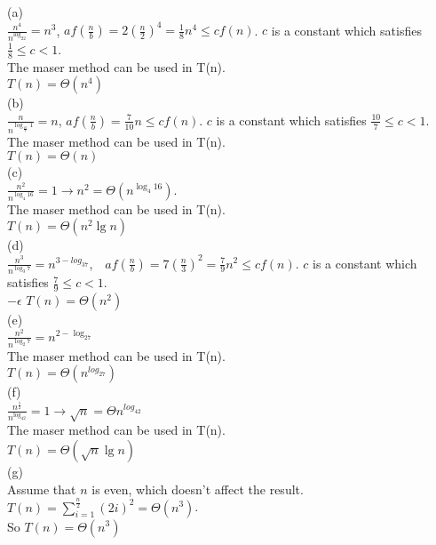 \documentclass[a4paper, justified]{tufte-handout}
\begin{document}
\begin{solution}
  (a)\\
  $\frac{n^4}{n^{\log_22}}=n^3$, $af(\frac{n}{b})=2(\frac{n}{2})^4=\frac{1}{8}n^4\leq cf(n)$. $c$ is a constant which satisfies $\frac{1}{8}\leq c<1$.\\
  The maser method can be used in T(n).\\
  $T(n)=\Theta(n^4)$\\

  \noindent(b)\\
  $\frac{n}{n^{\log_{\frac{10}{7}} 1}}=n$, $af(\frac{n}{b})=\frac{7}{10}n\leq cf(n)$. $c$ is a constant which satisfies $\frac{10}{7}\leq c<1$.\\
  The maser method can be used in T(n).\\
  $T(n)=\Theta(n)$\\

  \noindent(c)\\
  $\frac{n^2}{n^{\log_{4}16}}=1\to n^2=\Theta(n^{\log_4{16}})$.\\
  The maser method can be used in T(n).\\
  $T(n)=\Theta(n^2\lg n)$\\

  \noindent(d)\\
  $\frac{n^3}{n^{\log_{3}7}}=n^{3-log_37}$,$\quad af(\frac{n}{b})=7(\frac{n}{3})^2=\frac{7}{9}n^2\leq cf(n)$. $c$ is a constant which satisfies $\frac{7}{9}\leq c<1$.\\
  $-\epsilon$
  $T(n)=\Theta(n^2)$\\

  \noindent(e)\\
  $\frac{n^2}{n^{\log_{2}7}}=n^{2-\log_27}$\\
  The maser method can be used in T(n).\\
  $T(n)=\Theta(n^{log_27})$\\

  \noindent(f)\\
  $\frac{n^{\frac{1}{2}}}{n^{\log_42}}=1\to \sqrt{n}=\Theta{n^{log_42}}$\\
  The maser method can be used in T(n).\\
  $T(n)=\Theta(\sqrt{n}\lg n)$\\

  \noindent(g)\\
  Assume that $n$ is even, which doesn't affect the result.\\
  $T(n)=\sum\limits_{i=1}^{\frac{n}{2}}(2i)^2=\Theta(n^3)$.\\
  So $T(n)=\Theta(n^3)$
\end{solution}
\end{document}
